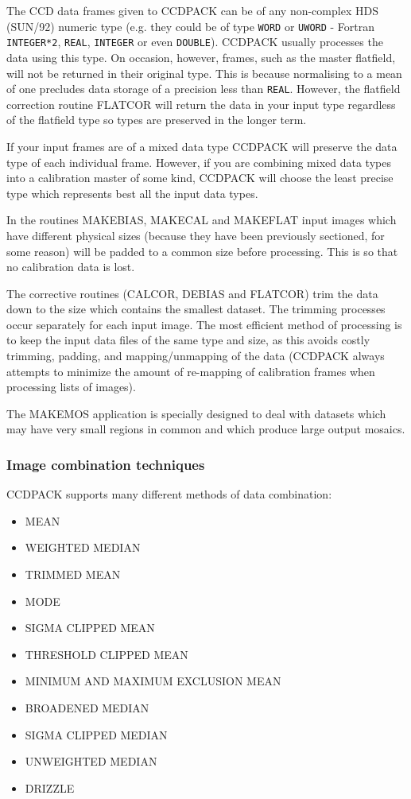 \documentclass[twoside,11pt]{article}
\newcommand{\htmlref}[2]{#1}
\newcommand{\latexhtml}[2]{#1}
\renewcommand{\_}{\texttt{\symbol{95}}}
\newcommand{\ttsize}{\latexhtml{\small}{}}
\newcommand{\text}[1]{{\ttsize \tt #1}}
\newcommand{\xroutine}[1]{\htmlref{{\sc #1}}{#1}}
\begin{document}
The CCD data frames given to CCDPACK can be of any non-complex HDS
(SUN/92) numeric type (e.g. they could be of type \text{\_WORD} or
\text{\_UWORD} - Fortran \text{INTEGER*2}, \text{\_REAL},
\text{\_INTEGER} or even  \text{\_DOUBLE}). CCDPACK usually processes
the data using this type. On occasion, however, frames, such as the
master flatfield, will not be returned in their original type. This is
because normalising to a mean of one precludes data storage of a
precision less than \text{\_REAL}. However, the flatfield correction routine
\xroutine{FLATCOR} will return the data in your input type regardless of the
flatfield type so types are preserved in the longer term.

If your input frames are of a mixed data type CCDPACK will preserve the data
type of each individual frame. However, if you are combining mixed data types
into a calibration master of some kind, CCDPACK will choose the least precise
type which represents best all the input data types.

In the routines \xroutine{MAKEBIAS}, \xroutine{MAKECAL} and
\xroutine{MAKEFLAT} input images which have
different physical sizes (because they have been previously sectioned,
for some reason) will be padded to a common size before processing. This
is so that no calibration data is lost.

The corrective routines (\xroutine{CALCOR}, \xroutine{DEBIAS} and \xroutine{FLATCOR}) trim the data down
to the size which contains the smallest dataset. The trimming processes
occur separately for each input image. The most efficient method of
processing is to keep the input data files of the same type and size, as
this avoids costly trimming, padding, and mapping/unmapping of the data
(CCDPACK always attempts to minimize the amount of re-mapping of
calibration frames when processing lists of images).

The \xroutine{MAKEMOS} application is specially designed to deal with datasets
which may have very small regions in common and which produce large
output mosaics.

\subsubsection{Image combination techniques \label{combinations}}

CCDPACK supports many different methods of data combination:
\begin{itemize}
\item MEAN
\item WEIGHTED MEDIAN
\item TRIMMED MEAN
\item MODE
\item SIGMA CLIPPED MEAN
\item THRESHOLD CLIPPED MEAN
\item MINIMUM AND MAXIMUM EXCLUSION MEAN
\item BROADENED MEDIAN
\item SIGMA CLIPPED MEDIAN
\item UNWEIGHTED MEDIAN
\item DRIZZLE
\end{itemize}
\end{document}
